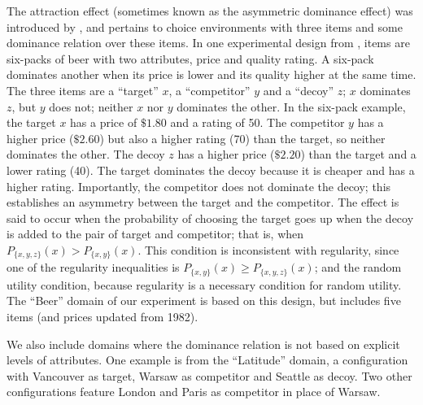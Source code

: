 \documentclass[11pt,letter]{article}
\newcommand{\bin}[2]{P_{\{#1,#2\}}(#1)}
\begin{document}
The attraction effect (sometimes known as the asymmetric dominance effect) was introduced by \citet{HubePaynPuto82}, and pertains to choice environments with three items and some dominance relation over these items.
In one experimental design from \citet{HubePaynPuto82}, items are six-packs of beer with two attributes, price and quality rating.
A six-pack dominates another when its price is lower and its quality higher at the same time.
The three items are a ``target'' $x$, a ``competitor'' $y$ and a ``decoy'' $z$; $x$ dominates $z$, but $y$ does not; neither $x$ nor $y$ dominates the other.
In the six-pack example, the target $x$ has a price of $\$1.80$ and a rating of 50.
The competitor $y$ has a higher price ($\$2.60$) but also a higher rating (70) than the target, so neither dominates the other.
The decoy $z$ has a higher price ($\$2.20$) than the target and a lower rating (40).
The target dominates the decoy because it is cheaper and has a higher rating.
Importantly, the competitor does not dominate the decoy; this establishes an asymmetry between the target and the competitor.
The effect is said to occur when the probability of choosing the target goes up when the decoy is added to the pair of target and competitor; that is, when $P_{\{x,y,z\}}(x) > \bin{x}{y}$.
This condition is inconsistent with regularity, since one of the regularity inequalities is $\bin{x}{y} \geq P_{\{x,y,z\}}(x)$; and the random utility condition, because regularity is a necessary condition for random utility.
The ``Beer'' domain of our experiment is based on this design, but includes five items (and prices updated from 1982).

We also include domains where the dominance relation is not based on explicit levels of attributes.
One example is from the ``Latitude'' domain, a configuration with Vancouver as target, Warsaw as competitor and Seattle as decoy.
Two other configurations feature London and Paris as competitor in place of Warsaw.
\end{document}
